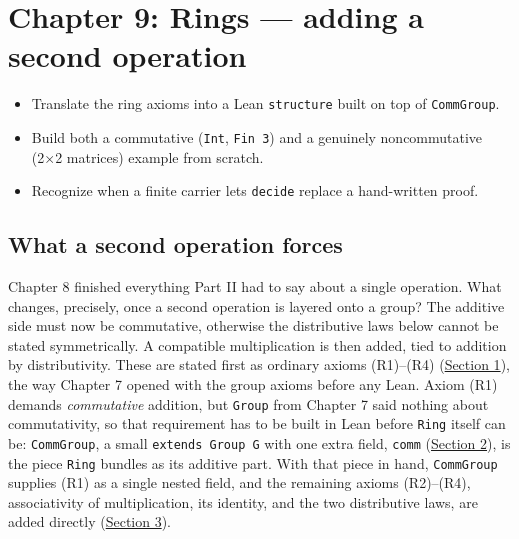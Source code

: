 \chapter{Chapter 9: Rings --- adding a second operation}\label{sec:09-rings:00-index:1}

\begin{learningobjectives}
\begin{itemize}
\tightlist
\item
  Translate the ring axioms into a Lean \texttt{structure} built on top of \texttt{CommGroup}.
\item
  Build both a commutative (\texttt{Int}, \texttt{Fin 3}) and a genuinely noncommutative (2×2 matrices) example from scratch.
\item
  Recognize when a finite carrier lets \texttt{decide} replace a hand-written proof.
\end{itemize}
\end{learningobjectives}


\section*{What a second operation forces}\label{sec:09-rings:00-index:2}

Chapter 8 finished everything Part II had to say about a single operation. What changes, precisely, once a second operation is layered onto a group? The additive side must now be commutative, otherwise the distributive laws below cannot be stated symmetrically. A compatible multiplication is then added, tied to addition by distributivity. These are stated first as ordinary axioms (R1)--(R4) (\hyperref[sec:09-rings:01-definition:1]{Section 1}), the way Chapter 7 opened with the group axioms before any Lean. Axiom (R1) demands \emph{commutative} addition, but \texttt{Group} from Chapter 7 said nothing about commutativity, so that requirement has to be built in Lean before \texttt{Ring} itself can be: \texttt{CommGroup}, a small \texttt{extends Group G} with one extra field, \texttt{comm} (\hyperref[sec:09-rings:02-comm-group:1]{Section 2}), is the piece \texttt{Ring} bundles as its additive part. With that piece in hand, \texttt{CommGroup} supplies (R1) as a single nested field, and the remaining axioms (R2)--(R4), associativity of multiplication, its identity, and the two distributive laws, are added directly (\hyperref[sec:09-rings:03-ring:1]{Section 3}).


